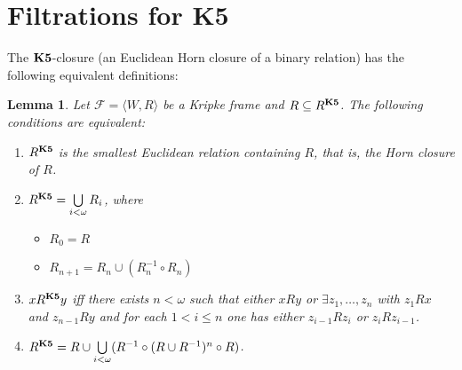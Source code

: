 \documentclass[a4paper]{article}
\theoremstyle{defin}
\theoremstyle{theorem}
\theoremstyle{prop}
\theoremstyle{lemma}
\newtheorem{lemma}{Lemma}
\theoremstyle{fact}
\theoremstyle{ex}
\theoremstyle{col}
\theoremstyle{claim}
\begin{document}
\section{Filtrations for {\bf K5}}

The ${\bf K5}$-closure (an Euclidean Horn closure of a binary relation) has the following equivalent definitions:
\begin{lemma} \label{equivHorn}
  Let $\mathcal{F} = \langle W, R \rangle$ be a Kripke frame and $R \subseteq R^{\bf K5}$.
  The following conditions are equivalent:

  \begin{enumerate}
    \item $R^{\bf K5}$ is the smallest Euclidean relation containing $R$, that is, the Horn closure of $R$.
    \item $R^{\bf K5} = \bigcup \limits_{i < \omega} R_i$, where
    \begin{itemize}
      \item $R_0 = R$
      \item $R_{n + 1} = R_n \cup (R^{-1}_n \circ R_n)$
    \end{itemize}
    \item $x R^{\bf K5} y$ iff there exists $n < \omega$ such that
    either $x R y$ or $\exists z_1, \dots, z_n$ with $z_1 R x$ and $z_{n - 1} R y$ and for each $1 < i \leq n$ one has
    either $z_{i - 1} R z_i$ or $z_i R z_{i - 1}$.
    \item $R^{\bf K5} = R \cup \bigcup \limits_{i < \omega} (R^{-1} \circ (R \cup R^{-1})^n \circ R)$.
  \end{enumerate}
\end{lemma}
\end{document}

